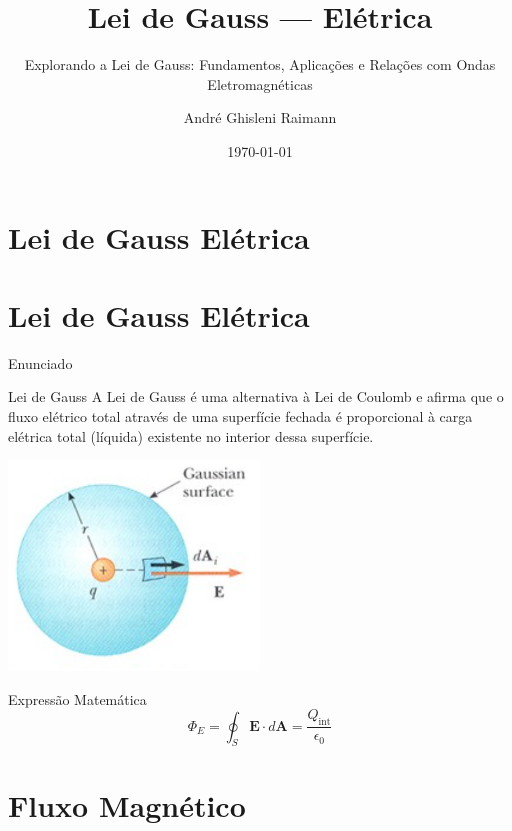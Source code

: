\documentclass{beamer}
\title{Lei de Gauss — Elétrica}
\subtitle{Explorando a Lei de Gauss: Fundamentos, Aplicações e Relações com Ondas Eletromagnéticas}
\author{André Ghisleni Raimann}
\institute{Instituto Federal de Santa Catarina — Campus Chapecó}
\date{\today}
\begin{document}
  \begin{frame}
  \titlepage
  \end{frame}
  \section{Lei de Gauss Elétrica}
  \section{Lei de Gauss Elétrica}

  \begin{frame}{Enunciado}
  \begin{block}{Lei de Gauss}
  A Lei de Gauss é uma alternativa à Lei de Coulomb e afirma que o fluxo elétrico total através de uma superfície fechada é proporcional à carga elétrica total (líquida) existente no interior dessa superfície. 
  \end{block}
  
  \begin{minipage}{0.5\textwidth}
    \centering
    \includegraphics[width=0.5\textwidth]{images/lei_de_gauss.png}
  \end{minipage}%
  \hfill
  \begin{minipage}{0.45\textwidth}
    \begin{block}{Expressão Matemática}
    \[
    \Phi_E = \oint_S \mathbf{E} \cdot d\mathbf{A} = \frac{Q_{\text{int}}}{\epsilon_0}
    \]
    \end{block}
  \end{minipage}

  \end{frame}

  \section{Fluxo Magnético}
\end{document}

